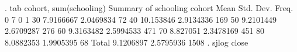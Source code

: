 .  tab cohort, sum(schooling)
{\smallskip}
            {\VBAR}        Summary of schooling
     cohort {\VBAR}        Mean   Std. Dev.       Freq.
          0 {\VBAR}           7           0           1
         30 {\VBAR}   7.9166667   2.0469834          72
         40 {\VBAR}   10.153846   2.9134336         169
         50 {\VBAR}   9.2101449   2.6709287         276
         60 {\VBAR}   9.3163482   2.5994533         471
         70 {\VBAR}    8.827051   2.3478169         451
         80 {\VBAR}   8.0882353   1.9905395          68
      Total {\VBAR}   9.1206897   2.5795936        1508
{\smallskip}
.  sjlog close
{\smallskip}
